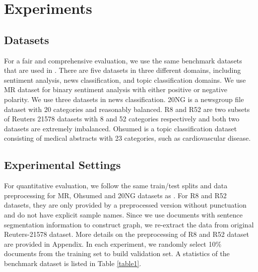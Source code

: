 \documentclass[letterpaper]{article} %
\begin{document}
\section{Experiments}
\subsection{Datasets}
For a fair and comprehensive evaluation, we use the same benchmark datasets that are used in \cite{yao2019graph}. There are five datasets in three different domains, including sentiment analysis, news classification, and topic classification domains. We use MR dataset for binary sentiment analysis with either positive or negative polarity. We use three datasets in news classification. 20NG is a newsgroup file dataset with 20 categories and reasonably balanced. R8 and R52 are two subsets of Reuters 21578 \cite{Reuters} datasets with 8 and 52 categories respectively and both two datasets are extremely imbalanced. Ohsumed is a topic classification dataset consisting of medical abstracts with 23 categories, such as cardiovascular disease. 
\subsection{Experimental Settings}
For quantitative evaluation, we follow the same train/test splits and data preprocessing for MR, Ohsumed and 20NG datasets as \cite{kim-2014-convolutional,yao2019graph}. For R8 and R52 datasets, they are only provided by a preprocessed version without punctuation and do not have explicit sample names. Since we use documents with sentence segmentation information to construct graph, we re-extract the data from original Reuters-21578 dataset. 
More details on the preprocessing of R8 and R52 dataset are provided in Appendix.
In each experiment, we randomly select 10\% documents from the training set to build validation set. 
A statistics of the benchmark dataset is listed in Table \ref{table1}. 


\end{document}
